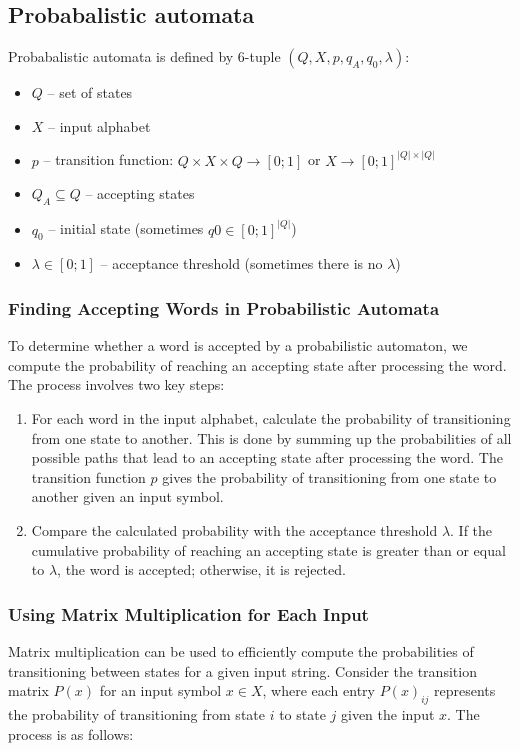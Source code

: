 \documentclass[hidelinks,12pt]{article}
\begin{document}
\subsection{Probabalistic automata}

Probabalistic automata is defined by 6-tuple $(Q,X,p,q_A, q_0, \lambda)$:

\begin{itemize}
	\item $Q$ – set of states
	\item $X$ – input alphabet
	\item $p$ – transition function: $Q \times X \times Q → [0;1]$ or $X \to {[0;1]}^{|Q|\times|Q|}$
	\item $Q_A \subseteq Q$ – accepting states
	\item $q_0$ – initial state (sometimes $q0 \in [0;1]^{|Q|}$)
	\item $\lambda \in [0;1]$ – acceptance threshold (sometimes there is no $\lambda$) 
\end{itemize}

\subsubsection{Finding Accepting Words in Probabilistic Automata}

To determine whether a word is accepted by a probabilistic automaton, we
compute the probability of reaching an accepting state after processing the
word. The process involves two key steps:

\begin{enumerate}
  \item   For each word in the input alphabet, calculate the probability of transitioning from one state to another. This is done by summing up the probabilities of all possible paths that lead to an accepting state after processing the word. The transition function $p$ gives the probability of transitioning from one state to another given an input symbol.

  \item   Compare the calculated probability with the acceptance threshold $\lambda$. If the cumulative probability of reaching an accepting state is greater than or equal to $\lambda$, the word is accepted; otherwise, it is rejected.

\end{enumerate}

\subsubsection{Using Matrix Multiplication for Each Input}
Matrix multiplication can be used to efficiently compute the probabilities of transitioning between states for a given input string. Consider the transition matrix $P(x)$ for an input symbol $x \in X$, where each entry $P(x)_{ij}$ represents the probability of transitioning from state $i$ to state $j$ given the input $x$. The process is as follows:
\end{document}
